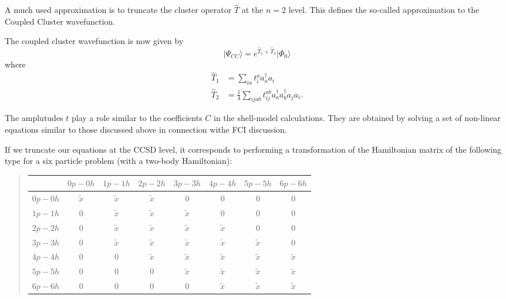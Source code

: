 \documentclass[%
twoside,                 %
final,                   %
10pt]{article}
\begin{document}
A much used approximation is to  truncate the cluster operator $\hat{T}$ at the $n=2$ level. This defines the so-called approximation to the Coupled Cluster wavefunction.

The coupled cluster wavefunction is now given by
\begin{equation*}
            \vert \Psi_{CC}\rangle = e^{\hat{T}_1 + \hat{T}_2} \vert \Phi_0\rangle
\end{equation*}
where 
        \begin{align*}
            \hat{T}_1 &= 
            \sum_{ia}
                t_{i}^{a} a_{a}^\dagger a_i \\
            \hat{T}_2 &= \frac{1}{4} 
            \sum_{ijab}
                t_{ij}^{ab} a_{a}^\dagger a_{b}^\dagger a_{j} a_{i}.
        \end{align*}

The amplutudes $t$ play a role similar to the coefficients $C$ in the shell-model calculations. They are obtained by solving a set of non-linear equations
similar to those discussed above in connection withe FCI discussion.

If we truncate our equations at the CCSD level, it corresponds to performing a transformation of the Hamiltonian matrix of the following type for a six particle problem (with a two-body Hamiltonian):


\begin{quote}
\begin{tabular}{cccccccc}
\hline
\multicolumn{1}{c}{  } & \multicolumn{1}{c}{ $0p-0h$ } & \multicolumn{1}{c}{ $1p-1h$ } & \multicolumn{1}{c}{ $2p-2h$ } & \multicolumn{1}{c}{ $3p-3h$ } & \multicolumn{1}{c}{ $4p-4h$ } & \multicolumn{1}{c}{ $5p-5h$ } & \multicolumn{1}{c}{ $6p-6h$ } \\
\hline
$0p-0h$ & $\tilde{x}$ & $\tilde{x}$ & $\tilde{x}$ & 0           & 0           & 0           & 0           \\
$1p-1h$ & 0           & $\tilde{x}$ & $\tilde{x}$ & $\tilde{x}$ & 0           & 0           & 0           \\
$2p-2h$ & 0           & $\tilde{x}$ & $\tilde{x}$ & $\tilde{x}$ & $\tilde{x}$ & 0           & 0           \\
$3p-3h$ & 0           & $\tilde{x}$ & $\tilde{x}$ & $\tilde{x}$ & $\tilde{x}$ & $\tilde{x}$ & 0           \\
$4p-4h$ & 0           & 0           & $\tilde{x}$ & $\tilde{x}$ & $\tilde{x}$ & $\tilde{x}$ & $\tilde{x}$ \\
$5p-5h$ & 0           & 0           & 0           & $\tilde{x}$ & $\tilde{x}$ & $\tilde{x}$ & $\tilde{x}$ \\
$6p-6h$ & 0           & 0           & 0           & 0           & $\tilde{x}$ & $\tilde{x}$ & $\tilde{x}$ \\
\hline
\end{tabular}
\end{quote}
\end{document}
